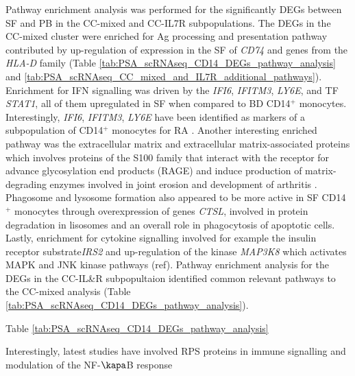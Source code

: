 Pathway enrichment analysis was performed for the significantly DEGs between SF and PB in the CC-mixed and CC-IL7R subpopulations. The DEGs in the CC-mixed cluster were enriched for Ag processing and presentation pathway contributed by up-regulation of expression in the SF of \textit{CD74} and genes from the \textit{HLA-D} family \parencite{Lamb1992} (Table \ref{tab:PSA_scRNAseq_CD14_DEGs_pathway_analysis} and \ref{tab:PSA_scRNAseq_CC_mixed_and_IL7R_additional_pathways}). Enrichment for IFN signalling was driven by the \textit{IFI6}, \textit{IFITM3}, \textit{LY6E}, \parencite{ISG15} and \the TF \textit{STAT1}, all of them upregulated in SF when compared to BD CD14$^+$ monocytes. Interestingly, \textit{IFI6}, \textit{IFITM3}, \textit{LY6E} have been identified as markers of a subpopulation of CD14$^+$ monocytes for RA \parencite{Zhang2018}. Another interesting enriched pathway was the extracellular matrix and extracellular matrix-associated proteins which involves proteins of the S100 family that interact with the receptor for advance glycosylation end products (RAGE)
and induce production of matrix-degrading enzymes involved in joint erosion and development of arthritis \parencite{Raghunatha2012}. Phagosome and lysosome formation also appeared to be more active in SF CD14$^+$ monocytes through overexpression of genes \textit{CTSL}, involved in protein degradation in lisosomes and an overall role in phagocytosis of apoptotic cells. Lastly, enrichment for cytokine signalling involved for example the insulin receptor substrate\textit{IRS2} and up-regulation of the kinase \textit{MAP3K8} which activates MAPK and JNK kinase pathways (ref). Pathway enrichment analysis for the DEGs in the CC-IL&R subpopultaion identified common relevant pathways to the CC-mixed analysis (Table \ref{tab:PSA_scRNAseq_CD14_DEGs_pathway_analysis}).
   
Table \ref{tab:PSA_scRNAseq_CD14_DEGs_pathway_analysis}



Interestingly, latest studies have involved RPS proteins in immune signalling and modulation of the NF-$\kapa$B response \parencite{Zhou2015}

